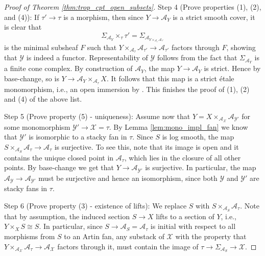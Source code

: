 \documentclass[11pt]{amsart}
\theoremstyle{definition}
\theoremstyle{remark}
\begin{document}
\begin{proof}[Proof of Theorem \ref{thm:trop_cpt_open_subsets}]
	Step 4 (Prove properties (1), (2), and (4)): If $\tau'\to \tau$ is a morphism, then since $Y\to \mathcal{A}_Y$ is a strict smooth cover,
	it is clear that
	$$\Sigma_{\mathcal{A}_Y}\times_{\tau}\tau'=\Sigma_{\mathcal{A}_{Y\times_{\mathcal{A}_{\tau}}\mathcal{A}_{\tau'}}}$$
	is the minimal subsheaf $F$ such that $Y\times_{\mathcal{A}_{\tau}}\mathcal{A}_{\tau'}\to \mathcal{A}_{\tau'}$ factors through $F$,
	showing that $\mathcal{Y}$ is indeed a functor. Representability of $\mathcal{Y}$ follows from the fact that
	$\Sigma_{\mathcal{A}_Y}$ is a finite cone complex. By construction
	of $\mathcal{A}_Y$, the map $Y\to \mathcal{A}_Y$ is strict.
	Hence by base-change, so is $Y\to \mathcal{A}_Y\times_{\mathcal{A}_{\tau}}X$.
	It follows that this map is a strict étale monomorphism, i.e.,
	an open immersion by \cite[Tag 025G]{stacks-project}. This finishes the proof of (1), (2) and (4) of the above list.

	Step 5 (Prove property (5) - uniqueness): Assume now that $Y=X\times_{\mathcal{A}_{\mathcal{X}}}\mathcal{A}_{\mathcal{Y}'}$ for some monomorphism
	$\mathcal{Y}'\to \mathcal{X}=\tau$. By Lemma \ref{lem:mono_impl_fan} we know that $\mathcal{Y}'$ is isomorphic to a stacky fan in $\tau$.
	Since $S$ is log smooth, the map $S\times_{\mathcal{A}_{S}}\mathcal{A}_{\tau}\to \mathcal{A}_{\tau}$ is surjective. To see this,
	note that its image is open
	and it contains the unique closed point in $\mathcal{A}_{\tau}$, which lies in the closure of all other points. By base-change we get that
	$Y\to \mathcal{A}_{\mathcal{Y}'}$ is surjective. In particular, the map $\mathcal{A}_{\mathcal{Y}}\to \mathcal{A}_{\mathcal{Y}'}$
	must be surjective and hence an isomorphism, since both $\mathcal{Y}$ and $\mathcal{Y}'$ are stacky fans in $\tau$.

	Step 6 (Prove property (3) - existence of lifts): We replace $S$ with $S\times_{\mathcal{A}_S}\mathcal{A}_{\tau}$.
	Note that by assumption, the induced section $S\to X$ lifts to a section of $Y$, i.e.,
	$Y\times_{X}S\cong S$. In particular, since $S\to \mathcal{A}_S=\mathcal{A}_{\tau}$ is initial
	with respect to all morphisms from $S$ to an Artin fan, any
	substack of $\mathcal{X}$ with the property that $Y\times_{\mathcal{A}_{\mathcal{X}}}\mathcal{A}_{\tau}\to \mathcal{A}_{\mathcal{X}}$
	factors through it, must contain the image of $\tau\to \Sigma_{\mathcal{A}_S}\to \mathcal{X}$.


\end{proof}
\end{document}
